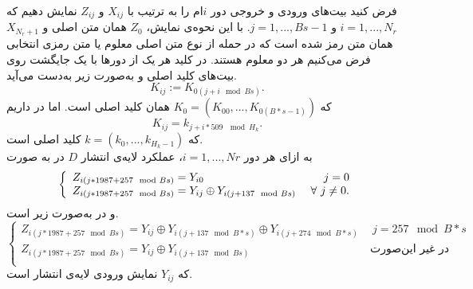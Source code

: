 فرض کنید بیت‌های ورودی و خروجی دور 
$i$ام
را به ترتیب با 
$X_{ij}$
و 
$Z_{ij}$
نمایش دهیم که 
$i = 1,...,N_{r}$
و
$j = 1,...,Bs-1$.
با این نحوه‌ی نمایش، 
$Z_{0}$
همان متن اصلی و 
$X_{N_{r}+ 1}$
همان متن رمز شده است که در حمله از نوع  متن اصلی معلوم یا متن رمزی انتخابی  فرض می‌کنیم هر دو معلوم هستند.  در  
کلید هر یک از دورها با یک جایگشت روی بیت‌های کلید اصلی و به‌صورت زیر به‌دست می‌آید. 
$$K_{ij}:= K_{0(j+i\mod Bs)}.$$
که 
$K_{0} = (K_{00},...,K_{0 (B*s - 1)})$
همان کلید اصلی است. 
اما در 
داریم
$$K_{ij} = k_{j + i*509 \ \mod H_{k}}.$$
که 
$k = (k_{0},...,k_{H_{k} - 1})$
کلید اصلی است. \\
به ازای هر دور  
$i = 1,...,Nr$، 
عملکرد لایه‌ی انتشار 
$D$
در 
به صورت 
$$\left\{
\begin{array}{lr}
Z_{i(j*1987 + 257 \mod Bs)} = Y_{i0} &\  \  j = 0\\
Z_{i(j*1987 + 257 \mod Bs)} = Y_{ij}\oplus Y_{i(j+137 \mod Bs)}& \ \fa  \ j\neq 0.\\
\end{array}\right.$$
و در 
به‌صورت زیر است. 
$$\left\{
\begin{array}{lr}
Z_{i(j*1987 + 257 \mod Bs)} = Y_{ij} \oplus Y_{i(j+137 \mod B*s)} \oplus Y_{i(j + 274 \mod B*s)} &\  \  j = 257 \mod B*s\\
Z_{i(j*1987 + 257 \mod Bs)} = Y_{ij}\oplus Y_{i(j+137 \mod Bs)}& \ \text{در غیر این‌صورت}\\
\end{array}\right.$$
که 
$Y_{ij}$
نمایش ورودی لایه‌ی انتشار است. 


